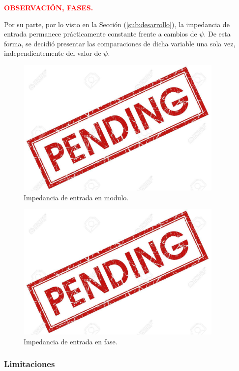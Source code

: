 \begin{center}
	\textcolor{red}{\textbf{OBSERVACIÓN, FASES.}}
\end{center}

Por su parte, por lo visto en la Sección (\ref{sub:desarrollo}), la impedancia de entrada permanece prácticamente constante frente a cambios de $\psi$. De esta forma, se decidió presentar las comparaciones de dicha variable una sola vez, independientemente del valor de $\psi$.
\begin{figure}[H]	
	\centering
	\includegraphics[width=0.9\textwidth]{Imagenes/ZinCompMod.png}
	\caption{Impedancia de entrada en modulo.}
	\label{fig:ZinCompMod}
\end{figure}
\begin{figure}[H]	
	\centering
	\includegraphics[width=0.9\textwidth]{Imagenes/ZinCompPh.png}
	\caption{Impedancia de entrada en fase.}
	\label{fig:ZinCompPh}
\end{figure}

\subsubsection{Limitaciones}

